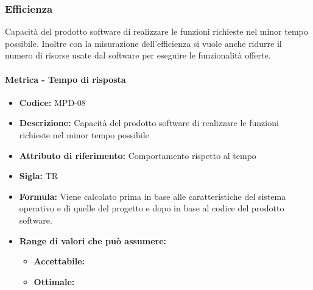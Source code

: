  \subsubsection{Efficienza}
 Capacità del prodotto software di realizzare le funzioni richieste nel minor tempo possibile. Inoltre con la misurazione dell’efficienza si vuole anche ridurre il numero di risorse usate dal software per eseguire le funzionalità offerte.
 
            \paragraph{Metrica - Tempo di risposta } 
               \begin{itemize}
          \item  \textbf{Codice:} MPD-08
          \item  \textbf{Descrizione:} Capacità del prodotto software di realizzare le funzioni richieste nel minor tempo possibile
         \item   \textbf{Attributo di riferimento:} Comportamento rispetto al tempo
         \item   \textbf{Sigla:} TR
         \item   \textbf{Formula:} Viene calcolato prima in base alle caratteristiche del sistema operativo e di quelle del progetto e dopo in base al codice del prodotto software.
                      \item \textbf{Range di valori che può assumere:}
        \begin{itemize}
            \item \textbf{Accettabile:} 
            \item \textbf{Ottimale:} 
        \end{itemize}
       \end{itemize}
              
